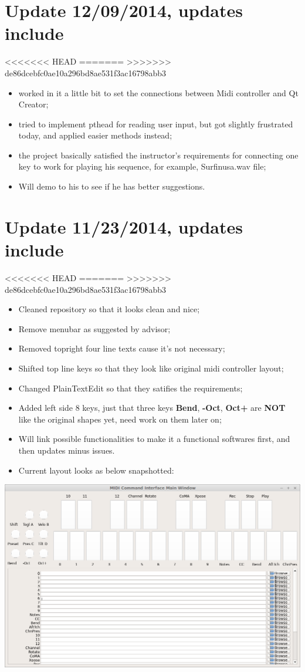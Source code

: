\documentclass[9pt,b5paper]{article}
\begin{document}
\section{Update 12/09/2014, updates include}
<<<<<<< HEAD
\label{sec-9}
=======
\label{sec-8}
>>>>>>> de86dcebfc0ae10a296bd8ae531f3ac16798abb3
\begin{itemize}
\item worked in it a little bit to set the connections between Midi controller and Qt Creator;
\item tried to implement pthead for reading user input, but got slightly frustrated today, and applied easier methods instead;
\item the project basically satisfied the instructor's requirements for connecting one key to work for playing his sequence, for example, Surfinusa.wav file;
\item Will demo to his to see if he has better suggestions.
\end{itemize}
\section{Update 11/23/2014, updates include}
<<<<<<< HEAD
\label{sec-10}
=======
\label{sec-9}
>>>>>>> de86dcebfc0ae10a296bd8ae531f3ac16798abb3
\begin{itemize}
\item Cleaned repository so that it looks clean and nice;
\item Remove menubar as suggested by advisor;
\item Removed topright four line texts cause it's not necessary;
\item Shifted top line keys so that they look like original midi controller layout;
\item Changed PlainTextEdit so that they satifies the requirements;
\item Added left side 8 keys, just that three keys \textbf{Bend}, \textbf{-Oct}, \textbf{Oct+} are \textbf{NOT} like the original shapes yet, need work on them later on;
\item Will link possible functionalities to make it a functional softwares first, and then updates minus issues.
\item Current layout looks as below snapshotted:
\end{itemize}

\includegraphics[width=.9\linewidth]{./pic/Screenshot_from_2014-11-23_13:20:06.png}  
\end{document}
